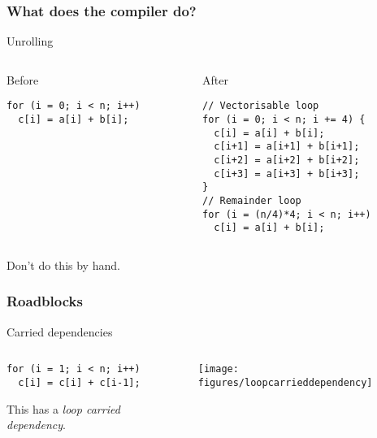 \documentclass[presentation,aspectratio=43,10pt]{beamer}
\begin{document}
\begin{frame}[fragile]
  \frametitle{What does the compiler do?}
  \begin{exampleblock}{Unrolling}
    \vspace{0.5\baselineskip}
    \begin{columns}[t]
      \begin{column}{0.37\textwidth}
        Before
\begin{verbatim}
for (i = 0; i < n; i++)
  c[i] = a[i] + b[i];
\end{verbatim}
      \end{column}
      \begin{column}{0.53\textwidth}
        After
\begin{verbatim}
// Vectorisable loop
for (i = 0; i < n; i += 4) {
  c[i] = a[i] + b[i];
  c[i+1] = a[i+1] + b[i+1];
  c[i+2] = a[i+2] + b[i+2];
  c[i+3] = a[i+3] + b[i+3];
}
// Remainder loop
for (i = (n/4)*4; i < n; i++)
  c[i] = a[i] + b[i];
\end{verbatim}
      \end{column}
    \end{columns}
    \begin{center}
      {\large Don't do this by hand.}
    \end{center}
  \end{exampleblock}
\end{frame}

\begin{frame}[fragile]
  \frametitle{Roadblocks}
  \begin{challenge}{Carried dependencies}
    \begin{columns}
      \begin{column}{0.45\textwidth}
\begin{verbatim}
for (i = 1; i < n; i++)
  c[i] = c[i] + c[i-1];
\end{verbatim}
        This has a \emph{loop carried dependency}.
      \end{column}
      \begin{column}{0.45\textwidth}
        \texttt{[image: figures/loopcarrieddependency]}
      \end{column}
    \end{columns}
  \end{challenge}
\end{frame}
\end{document}
